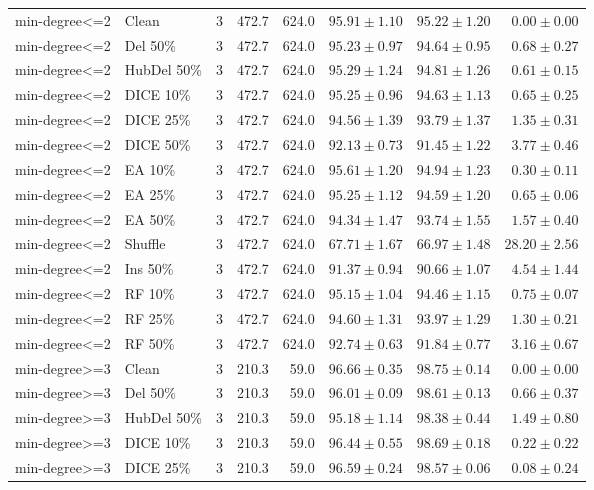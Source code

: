 {\begin{longtable}{llrrrrrr}
min-degree<=2 & Clean & 3 & 472.7 & 624.0 & $95.91\pm1.10$ & $95.22\pm1.20$ & $0.00\pm0.00$ \\
min-degree<=2 & Del 50\% & 3 & 472.7 & 624.0 & $95.23\pm0.97$ & $94.64\pm0.95$ & $0.68\pm0.27$ \\
min-degree<=2 & HubDel 50\% & 3 & 472.7 & 624.0 & $95.29\pm1.24$ & $94.81\pm1.26$ & $0.61\pm0.15$ \\
min-degree<=2 & DICE 10\% & 3 & 472.7 & 624.0 & $95.25\pm0.96$ & $94.63\pm1.13$ & $0.65\pm0.25$ \\
min-degree<=2 & DICE 25\% & 3 & 472.7 & 624.0 & $94.56\pm1.39$ & $93.79\pm1.37$ & $1.35\pm0.31$ \\
min-degree<=2 & DICE 50\% & 3 & 472.7 & 624.0 & $92.13\pm0.73$ & $91.45\pm1.22$ & $3.77\pm0.46$ \\
min-degree<=2 & EA 10\% & 3 & 472.7 & 624.0 & $95.61\pm1.20$ & $94.94\pm1.23$ & $0.30\pm0.11$ \\
min-degree<=2 & EA 25\% & 3 & 472.7 & 624.0 & $95.25\pm1.12$ & $94.59\pm1.20$ & $0.65\pm0.06$ \\
min-degree<=2 & EA 50\% & 3 & 472.7 & 624.0 & $94.34\pm1.47$ & $93.74\pm1.55$ & $1.57\pm0.40$ \\
min-degree<=2 & Shuffle & 3 & 472.7 & 624.0 & $67.71\pm1.67$ & $66.97\pm1.48$ & $28.20\pm2.56$ \\
min-degree<=2 & Ins 50\% & 3 & 472.7 & 624.0 & $91.37\pm0.94$ & $90.66\pm1.07$ & $4.54\pm1.44$ \\
min-degree<=2 & RF 10\% & 3 & 472.7 & 624.0 & $95.15\pm1.04$ & $94.46\pm1.15$ & $0.75\pm0.07$ \\
min-degree<=2 & RF 25\% & 3 & 472.7 & 624.0 & $94.60\pm1.31$ & $93.97\pm1.29$ & $1.30\pm0.21$ \\
min-degree<=2 & RF 50\% & 3 & 472.7 & 624.0 & $92.74\pm0.63$ & $91.84\pm0.77$ & $3.16\pm0.67$ \\
min-degree>=3 & Clean & 3 & 210.3 & 59.0 & $96.66\pm0.35$ & $98.75\pm0.14$ & $0.00\pm0.00$ \\
min-degree>=3 & Del 50\% & 3 & 210.3 & 59.0 & $96.01\pm0.09$ & $98.61\pm0.13$ & $0.66\pm0.37$ \\
min-degree>=3 & HubDel 50\% & 3 & 210.3 & 59.0 & $95.18\pm1.14$ & $98.38\pm0.44$ & $1.49\pm0.80$ \\
min-degree>=3 & DICE 10\% & 3 & 210.3 & 59.0 & $96.44\pm0.55$ & $98.69\pm0.18$ & $0.22\pm0.22$ \\
min-degree>=3 & DICE 25\% & 3 & 210.3 & 59.0 & $96.59\pm0.24$ & $98.57\pm0.06$ & $0.08\pm0.24$ \\

\end{longtable}}
